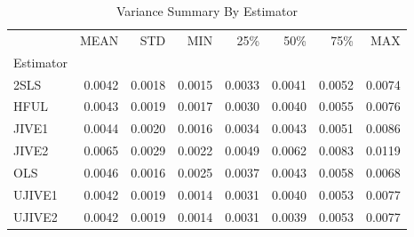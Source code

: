 \begin{table}[ht]
\centering
\caption{Variance Summary By Estimator}
\begin{tabular}{lrrrrrrr}
\toprule
 & MEAN & STD & MIN & 25\% & 50\% & 75\% & MAX \\
Estimator &  &  &  &  &  &  &  \\
\midrule
2SLS & 0.0042 & 0.0018 & 0.0015 & 0.0033 & 0.0041 & 0.0052 & 0.0074 \\
HFUL & 0.0043 & 0.0019 & 0.0017 & 0.0030 & 0.0040 & 0.0055 & 0.0076 \\
JIVE1 & 0.0044 & 0.0020 & 0.0016 & 0.0034 & 0.0043 & 0.0051 & 0.0086 \\
JIVE2 & 0.0065 & 0.0029 & 0.0022 & 0.0049 & 0.0062 & 0.0083 & 0.0119 \\
OLS & 0.0046 & 0.0016 & 0.0025 & 0.0037 & 0.0043 & 0.0058 & 0.0068 \\
UJIVE1 & 0.0042 & 0.0019 & 0.0014 & 0.0031 & 0.0040 & 0.0053 & 0.0077 \\
UJIVE2 & 0.0042 & 0.0019 & 0.0014 & 0.0031 & 0.0039 & 0.0053 & 0.0077 \\
\bottomrule
\end{tabular}
\end{table}
